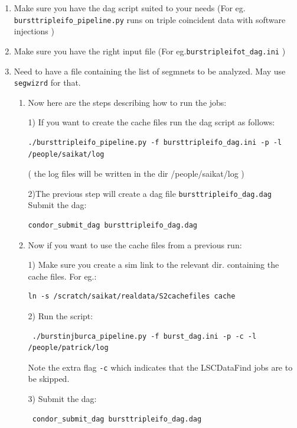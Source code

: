 \begin{enumerate}

\item Make sure you have the dag script suited to your needs
(For eg. \texttt{bursttripleifo\_pipeline.py} runs on triple coincident data
with software injections )

\item Make sure you have the right input file (For eg.\texttt{burstripleifot\_dag.ini} )

\item Need to have a file containing the list of segmnets to be analyzed. 
May use \texttt{segwizrd} for that.

\begin{enumerate}

\item Now here are the steps describing how to run the jobs: 

1) If you want to create the cache files run the dag script as follows: 
\begin{verbatim}
./bursttripleifo_pipeline.py -f bursttripleifo_dag.ini -p -l /people/saikat/log 
\end{verbatim}    
( the log files will be written in the dir /people/saikat/log )     

2)The previous step will create a dag file \texttt{bursttripleifo\_dag.dag}
Submit the dag:
\begin{verbatim}
condor_submit_dag bursttripleifo_dag.dag 
\end{verbatim}

\item  Now if you want to use the cache files from a previous run:    

1) Make sure you create a sim link to the relevant
dir. containing the cache files. For eg.:
\begin{verbatim}
ln -s /scratch/saikat/realdata/S2cachefiles cache   
\end{verbatim}

2) Run the script: 
\begin{verbatim}
 ./burstinjburca_pipeline.py -f burst_dag.ini -p -c -l /people/patrick/log    
\end{verbatim}
Note the extra flag \texttt{-c} which indicates that the LSCDataFind jobs are
to be skipped.
 
3) Submit the dag:
\begin{verbatim}
 condor_submit_dag bursttripleifo_dag.dag
\end{verbatim}
\end{enumerate}
\end{enumerate}

